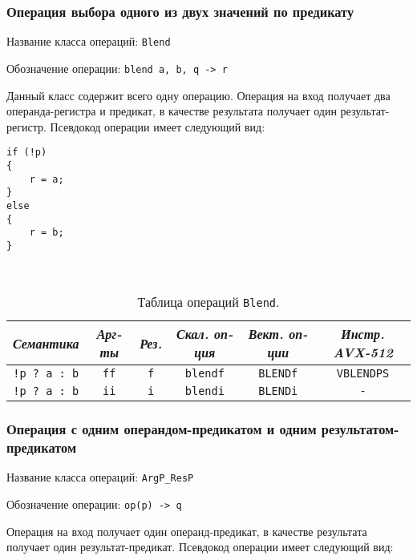 \documentclass[a4paper,12pt]{extarticle}                     %
\numberwithin{equation}{section}                             %
\numberwithin{figure}{section}                               %
\numberwithin{table}{section}                                %
\theoremstyle{plain}                                         %
\numberwithin{theorem}{section}                              %
\numberwithin{lemma}{section}                                %
\numberwithin{definition}{section}                           %
\begin{document}
\newpage

\subsubsection{Операция выбора одного из двух значений по предикату}

Название класса операций: \texttt{Blend}

Обозначение операции: \texttt{blend a, b, q -> r}

Данный класс содержит всего одну операцию. Операция на вход получает два операнда-регистра и предикат, в качестве результата получает один результат-регистр. Псевдокод операции имеет следующий вид:

\begin{lstlisting}[caption={Псевдокод операции Blend.}]
if (!p)
{
    r = a;
}
else
{
    r = b;
}

\end{lstlisting}

\

\begin{table}[!h]
\setcaptionmargin{0mm}
\onelinecaptionsfalse
{}
\caption{Таблица операций \texttt{Blend}.}
\bigskip
\begin{tabular}{|c|c|c|c|c|c|}
\hline
\textit{Семантика} & \textit{Арг-ты} & \textit{Рез.} & \textit{Скал. оп-ция} & \textit{Вект. оп-ции} & \textit{Инстр. AVX-512} \\
\hline
\texttt{!p ? a : b} & \texttt{ff} & \texttt{f} & \texttt{blendf} & \texttt{BLENDf} & \texttt{VBLENDPS} \\
\texttt{!p ? a : b} & \texttt{ii} & \texttt{i} & \texttt{blendi} & \texttt{BLENDi} & \texttt{-} \\
\hline
\end{tabular}
\end{table}

\newpage

\subsubsection{Операция с одним операндом-предикатом и одним результатом-предикатом}

Название класса операций: \texttt{ArgP\_ResP}

Обозначение операции: \texttt{op(p) -> q}

Операция на вход получает один операнд-предикат, в качестве результата получает один результат-предикат. Псевдокод операции имеет следующий вид:
\end{document}
